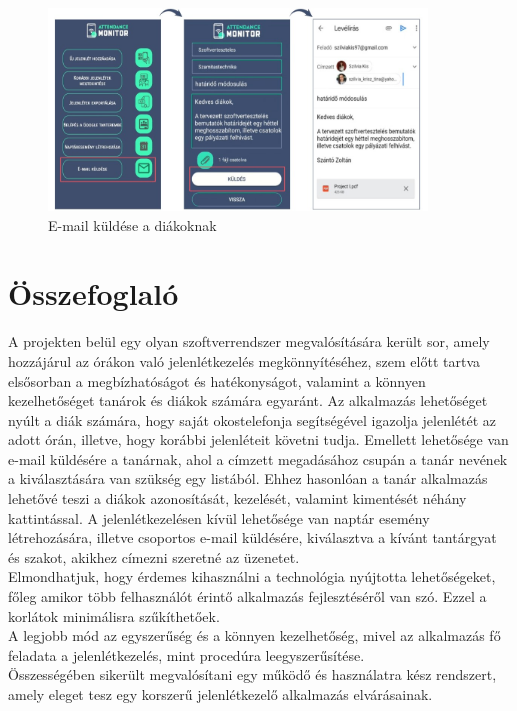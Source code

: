 \documentclass[12pt]{article}
\numberwithin{figure}{section}
\numberwithin{equation}{section}
\begin{document}
\begin{figure}[H]
	\centering
	\includegraphics[width=380px]{t_7.jpg}
	\caption{E-mail küldése a diákoknak}
	\label{fig:t_7}
\end{figure}

\newpage


\section{Összefoglaló}
A projekten belül egy olyan szoftverrendszer megvalósítására került sor, amely hozzájárul az órákon való jelenlétkezelés megkönnyítéséhez, szem előtt tartva elsősorban a megbízhatóságot és hatékonyságot, valamint a könnyen kezelhetőséget tanárok és diákok számára egyaránt. 
Az alkalmazás lehetőséget nyúlt a diák számára, hogy saját okostelefonja segítségével igazolja jelenlétét az adott órán, illetve, hogy korábbi jelenléteit követni tudja. Emellett lehetősége van e-mail küldésére a tanárnak, ahol a címzett megadásához csupán a tanár nevének a kiválasztására van szükség egy listából. Ehhez hasonlóan a tanár alkalmazás lehetővé teszi a diákok azonosítását, kezelését, valamint kimentését néhány kattintással. A jelenlétkezelésen kívül lehetősége van naptár esemény létrehozására, illetve csoportos e-mail küldésére, kiválasztva a kívánt tantárgyat és szakot, akikhez címezni szeretné az üzenetet. \\
Elmondhatjuk, hogy érdemes kihasználni a technológia nyújtotta lehetőségeket, főleg amikor több felhasználót érintő alkalmazás fejlesztéséről van szó. Ezzel a korlátok minimálisra szűkíthetőek.\\
A legjobb mód az egyszerűség és a könnyen kezelhetőség, mivel az alkalmazás fő feladata a jelenlétkezelés, mint procedúra leegyszerűsítése. \\
Összességében sikerült megvalósítani egy működő és használatra kész rendszert, amely eleget tesz egy korszerű jelenlétkezelő alkalmazás elvárásainak.

\newpage
\end{document}
